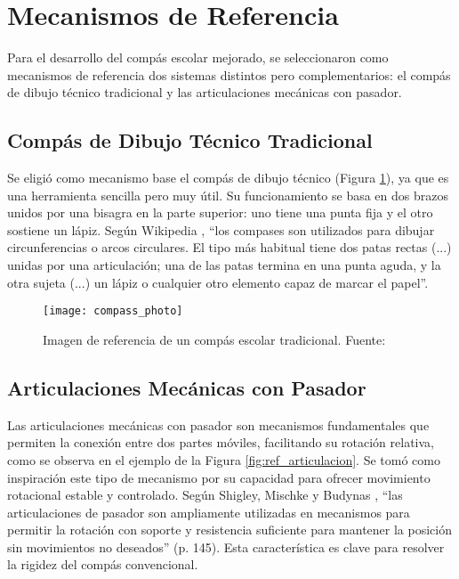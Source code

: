 \documentclass[11pt, a4paper]{article}
\begin{document}
\section{Mecanismos de Referencia}
\label{sec:referencias}
Para el desarrollo del compás escolar mejorado, se seleccionaron como mecanismos de referencia dos sistemas distintos pero complementarios: el compás de dibujo técnico tradicional y las articulaciones mecánicas con pasador.
\bigskip

\subsection{Compás de Dibujo Técnico Tradicional}
Se eligió como mecanismo base el compás de dibujo técnico (Figura \ref{fig:ref_compas}), ya que es una herramienta sencilla pero muy útil. Su funcionamiento se basa en dos brazos unidos por una bisagra en la parte superior: uno tiene una punta fija y el otro sostiene un lápiz.
Según Wikipedia \cite{wikipedia_utensilios}, \enquote{los compases son utilizados para dibujar circunferencias o arcos circulares. El tipo más habitual tiene dos patas rectas (...) unidas por una articulación; una de las patas termina en una punta aguda, y la otra sujeta (...) un lápiz o cualquier otro elemento capaz de marcar el papel}.
\bigskip
\bigskip

\begin{figure}[htbp]
    \centering
    \texttt{[image: compass\_photo]}
    \caption{Imagen de referencia de un compás escolar tradicional. Fuente: \cite{ref_img_compas}}
    \label{fig:ref_compas}
\end{figure}
\bigskip

\subsection{Articulaciones Mecánicas con Pasador}
Las articulaciones mecánicas con pasador son mecanismos fundamentales que permiten la conexión entre dos partes móviles, facilitando su rotación relativa, como se observa en el ejemplo de la Figura \ref{fig:ref_articulacion}. Se tomó como inspiración este tipo de mecanismo por su capacidad para ofrecer movimiento rotacional estable y controlado.
Según Shigley, Mischke y Budynas \cite{shigley_design}, \enquote{las articulaciones de pasador son ampliamente utilizadas en mecanismos para permitir la rotación con soporte y resistencia suficiente para mantener la posición sin movimientos no deseados} (p. 145). Esta característica es clave para resolver la rigidez del compás convencional.
\newpage
\end{document}
